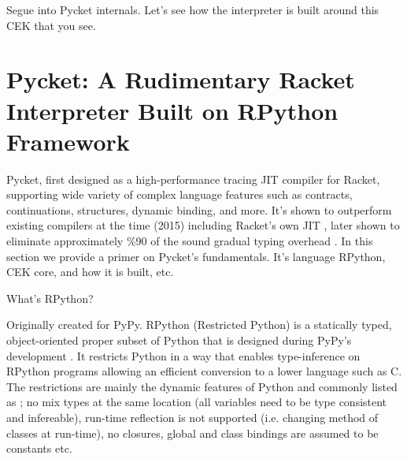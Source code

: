 
        \begin{paragraph-here}
            Segue into Pycket internals. Let's see how the interpreter is built around this CEK that you see.
        \end{paragraph-here}


    \section{Pycket: A Rudimentary Racket Interpreter Built on RPython Framework}
        \label{section:pycket-primer}

        \begin{paragraph-here}
            Pycket, first designed as a high-performance tracing JIT compiler for Racket, supporting wide variety of complex language features such as contracts, continuations, structures, dynamic binding, and more. It's shown to outperform existing compilers at the time (2015) including Racket's own JIT \cite{pycketmain}, later shown to eliminate approximately \%90 of the sound gradual typing overhead \cite{pycketmain2}. In this section we provide a primer on Pycket's fundamentals. It's language RPython, CEK core, and how it is built, etc.
        \end{paragraph-here}

        \begin{paragraph-here}
            What's RPython?

            Originally created for PyPy.
            RPython (Restricted Python) is a statically typed, object-oriented
            proper subset of Python that is designed during PyPy's development
            \cite{pypy06}. It restricts Python in a way that enables
            type-inference on RPython programs allowing an efficient conversion to
            a lower language such as C. The restrictions are mainly the dynamic
            features of Python and commonly listed as \cite{rpython07,rpython09};
            no mix types at the same location (all variables need to be type
            consistent and infereable), run-time reflection is not supported
            (i.e. changing method of classes at run-time), no closures, global and
            class bindings are assumed to be constants etc.
        \end{paragraph-here}



